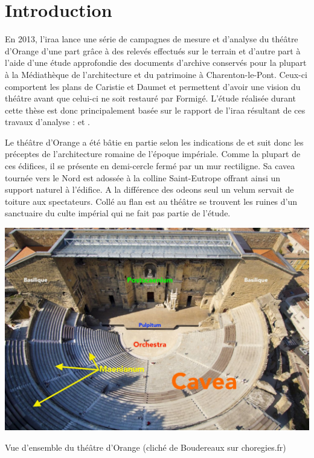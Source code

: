 		\section{Introduction}
		
		En 2013, l'\gls{iraa} lance une série de campagnes de mesure et d'analyse du théâtre d'Orange d'une part grâce à des relevés effectués sur le terrain et d'autre part à l'aide d'une étude approfondie des documents d'archive conservés pour la plupart à la Médiathèque de l'architecture et du patrimoine à Charenton-le-Pont. Ceux-ci comportent les plans de Caristie et Daumet et permettent d'avoir une vision du théâtre avant que celui-ci ne soit restauré par Formigé. L'étude réalisée durant cette thèse est donc principalement basée sur le rapport de l'\gls{iraa} résultant de ces travaux d'analyse : \cite{orangeTxt} et \citep{orangePl}.
		
		Le théâtre d'Orange a été bâtie en partie selon les indications de \cite{vitruve} et suit donc les préceptes de l'architecture romaine de l'époque impériale. Comme la plupart de ces édifices, il se présente en demi-cercle fermé par un mur rectiligne. Sa \gls{cavea} tournée vers le Nord est adossée à la colline Saint-Eutrope offrant ainsi un support naturel à l'édifice. A la différence des \glspl{odeon} seul un \gls{velum} servait de toiture aux spectateurs. Collé au flan est au théâtre se trouvent les ruines d'un sanctuaire du culte impérial qui ne fait pas partie de l'étude. 

\begin{figureth}
		\includegraphics[width=\linewidth]{images/vuensemble}
		\caption[Vue d'ensemble du théâtre d'Orange]{Vue d'ensemble du théâtre d'Orange (cliché de Boudereaux sur choregies.fr)}
\end{figureth}


